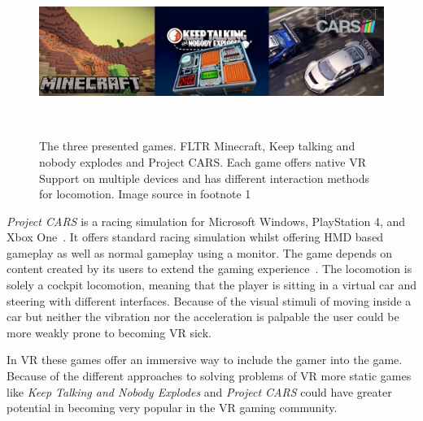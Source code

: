 \begin{figure}
	\centering
	\includegraphics[width=0.99\columnwidth]{./figures/banner}
	\caption[banner]{The three presented games. FLTR Minecraft, Keep talking and nobody explodes and Project CARS. Each game offers native VR Support on multiple devices and has different interaction methods for locomotion. Image source in footnote 1 \textcolor{white}{\footnotemark[1]}}~\label{fig:banner}
\end{figure}
\textit{Project CARS} is a racing simulation for Microsoft Windows, PlayStation 4, and Xbox One~\cite{game:projectC}. It offers standard racing simulation whilst offering HMD based gameplay as well as normal gameplay using a monitor. The game depends on content created by its users to extend the gaming experience~\cite{game:projectC}. \newline
The locomotion is solely a cockpit locomotion, meaning that the player is sitting in a virtual car and steering with different interfaces. Because of the visual stimuli of moving inside a car but neither the vibration nor the acceleration is palpable the user could be more weakly prone to becoming VR sick.

In VR these games offer an immersive way to include the gamer into the game. Because of the different approaches to solving problems of VR more static games like \textit{Keep Talking and Nobody Explodes} and \textit{Project CARS} could have greater potential in becoming very popular in the VR gaming community. 

